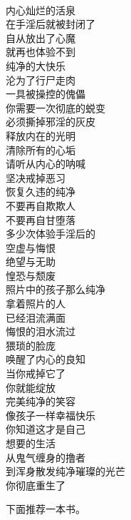 \begin{poem}[开启内心纯净的活泉]
    \begin{multicols}{3}
        \centering~\\
        内心灿烂的活泉 \\ 在手淫后就被封闭了 \\ 自从放出了心魔 \\ 就再也体验不到 \\ 纯净的大快乐 \\ 沦为了行尸走肉 \\ 一具被操控的傀儡 \\ 你需要一次彻底的蜕变 \\ 必须撕掉邪淫的灰皮 \\ 释放内在的光明 \\ 清除所有的心垢 \\ 请听从内心的呐喊 \\ 坚决戒掉恶习 \\ 恢复久违的纯净 \\ 不要再自欺欺人 \\ 不要再自甘堕落 \\ 多少次体验手淫后的 \\ 空虚与悔恨 \\ 绝望与无助 \\ 惶恐与颓废 \\ 照片中的孩子那么纯净 \\ 拿着照片的人 \\ 已经泪流满面 \\ 悔恨的泪水流过 \\ 猥琐的脸庞 \\ 唤醒了内心的良知 \\ 当你戒掉它了 \\ 你就能绽放 \\ 完美纯净的笑容 \\ 像孩子一样幸福快乐 \\ 你知道这才是自己 \\ 想要的生活 \\ 从鬼气缠身的撸者 \\ 到浑身散发纯净璀璨的光芒 \\ 你彻底重生了
    \end{multicols}
\end{poem}

下面推荐一本书。

